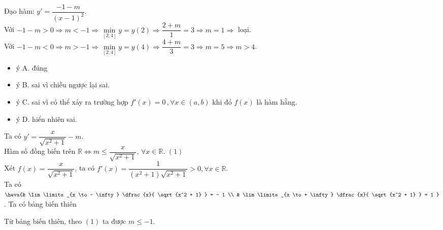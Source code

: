 \begin{Solbook}{10}
 \par \noindent  Đạo hàm: $y'=\dfrac {-1-m}{(x-1)^{2}}$. \\ Với $-1-m>0\Rightarrow m<-1\Rightarrow \min \limits _{[2;4]}y=y(2)\Rightarrow \dfrac {2+m}{1}=3\Rightarrow m=1\Rightarrow $ loại. \\ Với $-1-m<0\Rightarrow m>-1\Rightarrow \min \limits _{[2;4]}y=y(4)\Rightarrow \dfrac {4+m}{3}=3\Rightarrow m=5\Rightarrow m>4$. \par \noindent \selectC \hfill \qedEX 
\end{Solbook}
\begin{Solbook}{11}
 \par \noindent \begin {itemize} \item ý A. đúng \item ý B. sai vì chiều ngược lại sai. \item ý C. sai vì có thể xảy ra trường hợp $f'(x)=0\, ,\forall x \in (a,b)$ khi đó $f(x)$ là hàm hằng. \item ý D. hiển nhiên sai. \end {itemize} \par \noindent \selectB \hfill \qedEX 
\end{Solbook}
\begin{Solbook}{12}
 \par \noindent  Ta có $ y' = \dfrac {x }{ \sqrt {x^2 + 1}} - m $.\\ Hàm số đồng biến trên $ \mathbb {R} \Leftrightarrow m \leq \dfrac {x}{ \sqrt {x^2 + 1} }, \, \forall x \in \mathbb {R}$. \quad \quad $ (1) $\\ Xét $ f(x) = \dfrac {x}{ \sqrt {x^2 + 1}} $, ta có $ f'(x) = \dfrac {1}{ (x^2 + 1) \sqrt {x^2 + 1} } > 0, \forall x \in \mathbb {R} $.\\ Ta có $ \heva {& \lim \limits _{x \to - \infty } \dfrac {x}{ \sqrt {x^2 + 1} } = - 1 \\ & \lim \limits _{x \to + \infty } \dfrac {x}{ \sqrt {x^2 + 1} } = 1 } $. Ta có bảng biến thiên \begin {center}  \end {center} Từ bảng biến thiên, theo $ (1) $ ta được $ m \leq -1 $. \par \noindent \selectD \hfill \qedEX 
\end{Solbook}
